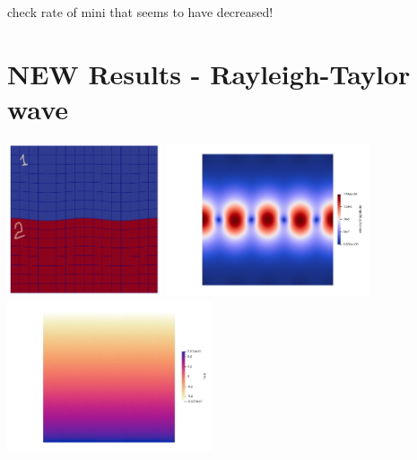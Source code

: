 check rate of mini that seems to have decreased!

\newpage
\section*{NEW Results - Rayleigh-Taylor wave}

\begin{center}
\includegraphics[height=4.5cm]{python_codes/fieldstone_120/images/rt_setup}
\includegraphics[height=4.5cm]{python_codes/fieldstone_120/images/rt_vel}
\includegraphics[height=4.5cm]{python_codes/fieldstone_120/images/rt_press}
\end{center}

